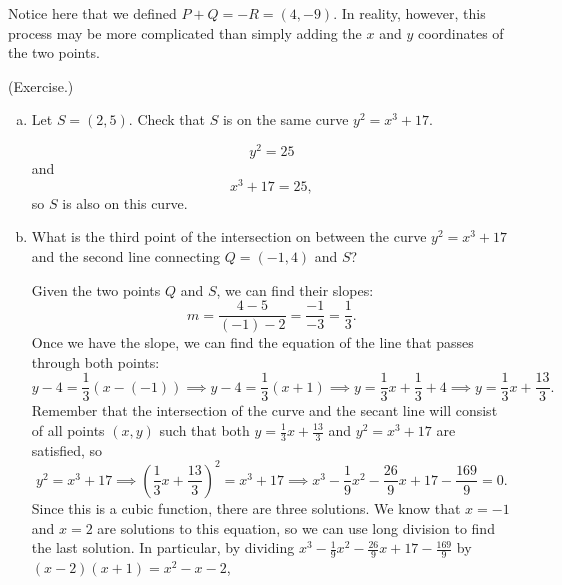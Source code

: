 \documentclass[letterpaper]{article}
\begin{document}
Notice here that we defined $P + Q = -R = (4, -9)$. In reality, however, this process may be more complicated than simply adding the $x$ and $y$ coordinates of the two points. 

\begin{mdframed}
    (Exercise.) 
    \begin{enumerate}[(a)]
        \item Let $S = (2, 5)$. Check that $S$ is on the same curve $y^2 = x^3 + 17$. 
        \begin{mdframed}
            \[y^2 = 25\]
            and 
            \[x^3 + 17 = 25,\]
            so $S$ is also on this curve. 
        \end{mdframed}
        \item What is the third point of the intersection on between the curve $y^2 = x^3 + 17$ and the second line connecting $Q = (-1, 4)$ and $S$?
        \begin{mdframed}
            Given the two points $Q$ and $S$, we can find their slopes: 
            \[m = \frac{4 - 5}{(-1) - 2} = \frac{-1}{-3} = \frac{1}{3}.\]
            Once we have the slope, we can find the equation of the line that passes through both points: 
            \[y - 4 = \frac{1}{3}(x - (-1)) \implies y - 4 = \frac{1}{3}(x + 1) \implies y = \frac{1}{3}x + \frac{1}{3} + 4 \implies y = \frac{1}{3}x + \frac{13}{3}.\]
            Remember that the intersection of the curve and the secant line will consist of all points $(x, y)$ such that both $y = \frac{1}{3}x + \frac{13}{3}$ and $y^2 = x^3 + 17$ are satisfied, so 
            \[y^2 = x^3 + 17 \implies \left(\frac{1}{3}x + \frac{13}{3}\right)^2 = x^3 + 17 \implies x^3 - \frac{1}{9}x^2 - \frac{26}{9}x + 17 - \frac{169}{9} = 0.\]
            Since this is a cubic function, there are three solutions. We know that $x = -1$ and $x = 2$ are solutions to this equation, so we can use long division to find the last solution. In particular, by dividing $x^3 - \frac{1}{9}x^2 - \frac{26}{9}x + 17 - \frac{169}{9}$ by $(x - 2)(x + 1) = x^2 - x - 2$,  
            
            \smallskip 


            \smallskip 


\end{mdframed}
\end{enumerate}
\end{mdframed}
\end{document}
